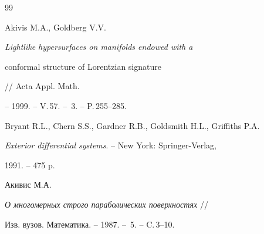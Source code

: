 \begin{thebibliography}{99}


Akivis M.A., Goldberg V.V.


{\em Lightlike hypersurfaces on manifolds endowed with a


conformal structure of Lorentzian signature} // Acta Appl. Math.


-- 1999. -- V.\,57. -- \No\,3. -- P.\,255--285.







Bryant R.L., Chern S.S., Gardner R.B., Goldsmith H.L., Griffiths P.A.


{\em Exterior differential systems}. -- New York: Springer-Verlag, 


1991. -- 475 p.





 Акивис М.А. %


{\em О многомерных строго параболических поверхностях} //


Изв. вузов. Математика. -- 1987. -- \No\,5. -- C.\,3--10.





\end{thebibliography}





\vskip 0.5cm









\smallskip









\label{end}











